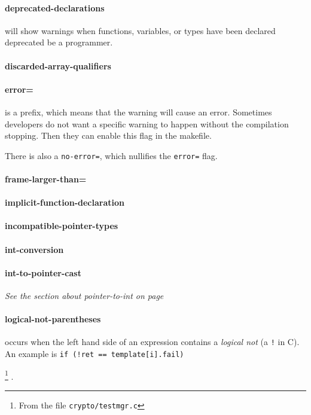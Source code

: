 \documentclass[a4paper,11pt]{report}
\newcommand{\textcode}[1]{
    \fboxsep=1pt
    \texttt{\colorbox{gray!20}{#1}}
}
\begin{document}
            \paragraph{deprecated-declarations}
will show warnings when functions, variables, or types have been declared 
deprecated be a programmer.


            \paragraph{discarded-array-qualifiers}
            \paragraph{error=}
is a prefix, which means that the warning will cause an error. Sometimes 
developers do not want a specific warning to happen without the compilation 
stopping. Then they can enable this flag in the makefile.

There is also a \texttt{no-error=}, which nullifies the \texttt{error=} flag.


            \paragraph{frame-larger-than=}
            \paragraph{implicit-function-declaration}
            \paragraph{incompatible-pointer-types}
            \paragraph{int-conversion}
            \paragraph{int-to-pointer-cast}
\emph{See the section about pointer-to-int on page \pageref{par:pointertoint}}

            \paragraph{logical-not-parentheses}
occurs when the left hand side of an expression contains a \emph{logical not} 
(a \texttt{!} in C). An example is \textcode{if (!ret == template[i].fail)}
    \footnote{From the file \texttt{crypto/testmgr.c}}
.
\end{document}
